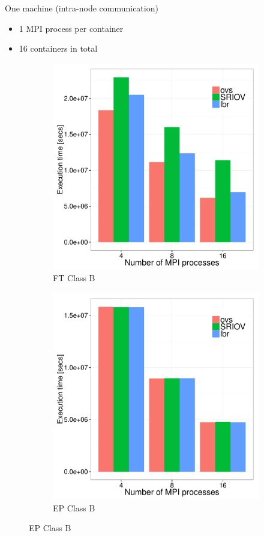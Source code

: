 \documentclass[11pt,xcolor=dvipsnames,presentation]{beamer}
\begin{document}
\begin{frame}[label=sec-4-0-10]{One machine (intra-node communication)}
\begin{itemize}
\item 1 MPI process per container
\item 16 containers in total
\end{itemize}

\begin{figure}
  \centering
  \begin{subfigure}[b]{0.42\textwidth}
    \caption{FT Class B}
    \includegraphics[scale=0.25,angle=0]{figures/intra-container-ftB.pdf}
  \end{subfigure}
  \begin{subfigure}[b]{0.42\textwidth}
    \caption{EP Class B}
    \includegraphics[scale=0.25,angle=0]{figures/intra-container-epB.pdf}

\end{subfigure}
\end{figure}
\end{frame}
\end{document}
